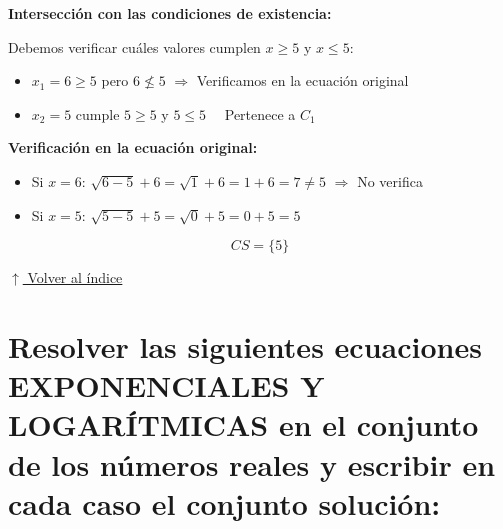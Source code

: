 \documentclass[12pt]{article}
\newcommand{\volverindice}{%
    \vspace{1em}%
    \begin{flushright}%
        \hyperlink{indice}{\small $\uparrow$ Volver al índice}%
    \end{flushright}%
}
\begin{document}
\begin{enumerate}[label=\alph*.-]
    \textbf{Intersección con las condiciones de existencia:}

    Debemos verificar cuáles valores cumplen $x \geq 5$ y $x \leq 5$:
    \begin{itemize}
        \item $x_1 = 6 \geq 5$ pero $6 \not\leq 5$ \quad $\Rightarrow$ Verificamos en la ecuación original
        \item $x_2 = 5$ cumple $5 \geq 5$ y $5 \leq 5$ \checkmark \ \ Pertenece a $C_1$
    \end{itemize}

    \textbf{Verificación en la ecuación original:}
    \begin{itemize}
        \item Si $x = 6$: $\sqrt{6-5} + 6 = \sqrt{1} + 6 = 1 + 6 = 7 \neq 5$ \quad $\Rightarrow$ No verifica
        \item Si $x = 5$: $\sqrt{5-5} + 5 = \sqrt{0} + 5 = 0 + 5 = 5$ \checkmark
    \end{itemize}

    \[
    \boxed{CS = \{5\}}
    \]

\end{enumerate}

\volverindice
\newpage

\section[Ecuaciones exponenciales y logarítmicas]{Resolver las siguientes ecuaciones EXPONENCIALES Y LOGARÍTMICAS en el conjunto de los números reales y escribir en cada caso el conjunto solución:}
\end{document}
